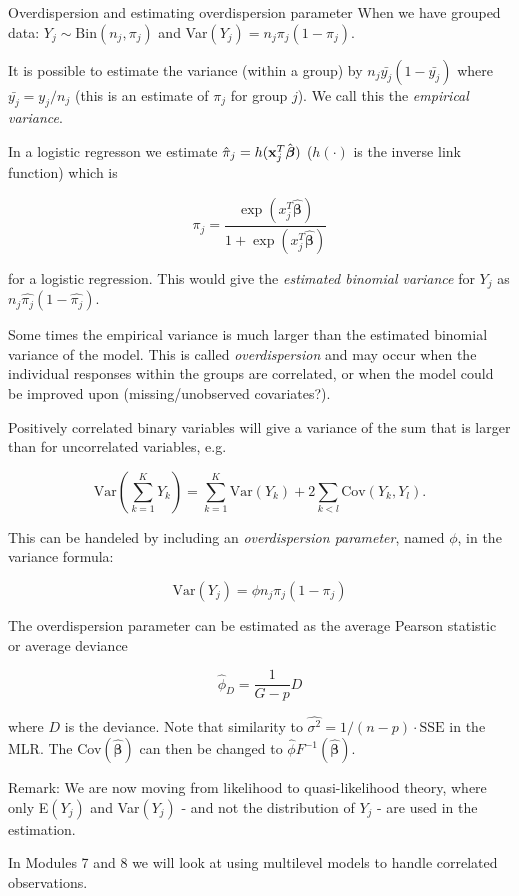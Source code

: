 \documentclass[
  ignorenonframetext,
]{beamer}
\begin{document}
\begin{frame}{Overdispersion and estimating overdispersion parameter}
\protect\hypertarget{overdispersion-and-estimating-overdispersion-parameter}{}
When we have grouped data: \(Y_j \sim \text{Bin} (n_j, \pi_j)\) and
Var\((Y_j) = n_j\pi_j(1-\pi_j)\).

It is possible to estimate the variance (within a group) by
\(n_j\bar{y_j}(1-\bar{y_j})\) where \(\bar{y_j} = y_j/n_j\) (this is an
estimate of \(\pi_j\) for group \(j\)). We call this the \emph{empirical
variance}.

In a logistic regresson we estimate
\(\hat{\pi}_j = h({\bf x}_j^T\hat{\boldsymbol{\beta}})\) (\(h(\cdot)\)
is the inverse link function) which is

\[\hat{\pi_j} = \frac{\exp(x_j^T \hat{\boldsymbol{\beta}})}{1+\exp(x_j^T \hat{\boldsymbol{\beta}})} \]

for a logistic regression. This would give the \emph{estimated binomial
variance} for \(Y_j\) as \(n_j\hat{\pi_j}(1-\hat{\pi_j})\).
\end{frame}

\begin{frame}
Some times the empirical variance is much larger than the estimated
binomial variance of the model. This is called \emph{overdispersion} and
may occur when the individual responses within the groups are
correlated, or when the model could be improved upon (missing/unobserved
covariates?).

Positively correlated binary variables will give a variance of the sum
that is larger than for uncorrelated variables, e.g.

\[\text{Var}(\sum_{k=1}^K Y_k) = \sum_{k=1}^K\text{Var}(Y_k) + 2\sum_{k<l} \text{Cov}(Y_k, Y_l).\]
\end{frame}

\begin{frame}
This can be handeled by including an \emph{overdispersion parameter},
named \(\phi\), in the variance formula:

\[ \text{Var}(Y_j) = \phi n_j \pi_j (1-\pi_j)\]
\end{frame}

\begin{frame}
The overdispersion parameter can be estimated as the average Pearson
statistic or average deviance

\[\hat{\phi}_D = \frac{1}{G-p} D\]

where \(D\) is the deviance. Note that similarity to
\(\hat{\sigma^2} = 1/(n-p)\cdot\text{SSE}\) in the MLR. The
Cov\((\hat{\boldsymbol{\beta}})\) can then be changed to
\(\hat{\phi}F^{-1}(\hat{\boldsymbol{\beta}})\).

Remark: We are now moving from likelihood to quasi-likelihood theory,
where only E\((Y_j)\) and Var\((Y_j)\) - and not the distribution of
\(Y_j\) - are used in the estimation.

In Modules 7 and 8 we will look at using multilevel models to handle
correlated observations.
\end{frame}
\end{document}
